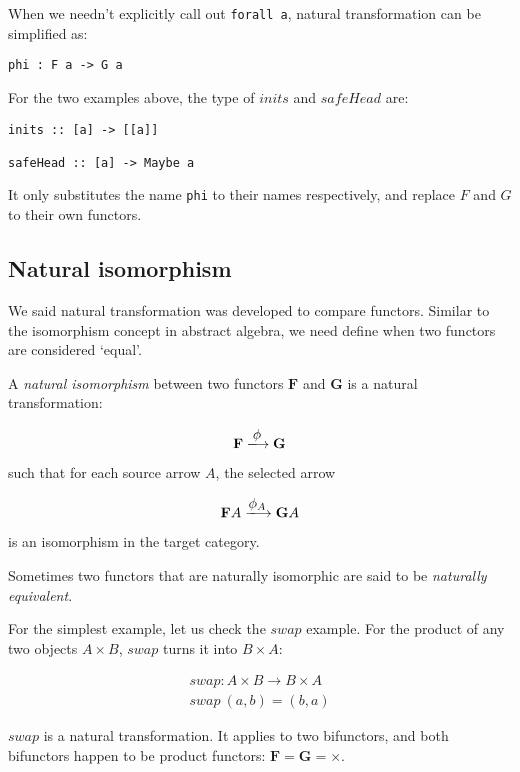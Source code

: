 \documentclass{article}
\begin{document}
When we needn't explicitly call out \texttt{forall a}, natural transformation can be simplified as:

\begin{lstlisting}
phi : F a -> G a
\end{lstlisting}

For the two examples above, the type of $inits$ and $safeHead$ are:

\begin{lstlisting}
inits :: [a] -> [[a]]

safeHead :: [a] -> Maybe a
\end{lstlisting}

It only substitutes the name \texttt{phi} to their names respectively, and replace $F$ and $G$ to their own functors.

\subsection{Natural isomorphism}

We said natural transformation was developed to compare functors. Similar to the isomorphism concept in abstract algebra, we need define when two functors are considered `equal'.

\begin{definition}
\normalfont
A {\em natural isomorphism} between two functors $\mathbf{F}$ and $\mathbf{G}$ is a natural transformation:

\[
  \mathbf{F} \arrowto{\phi} \mathbf{G}
\]

such that for each source arrow $A$, the selected arrow

\[
  \mathbf{F}A \arrowto{\phi_A} \mathbf{G}A
\]

is an isomorphism in the target category.
\end{definition}

Sometimes two functors that are naturally isomorphic are said to be {\em naturally equivalent}.

For the simplest example, let us check the $swap$ example. For the product of any two objects $A \times B$, $swap$ turns it into $B \times A$:

\[
\begin{array}{l}
swap : A \times B \to B \times A \\
swap\ (a, b) = (b, a)
\end{array}
\]

$swap$ is a natural transformation. It applies to two bifunctors, and both bifunctors happen to be product functors: $\mathbf{F} = \mathbf{G} = \times$.
\end{document}
